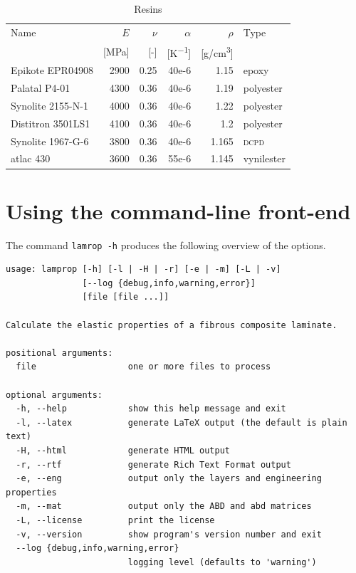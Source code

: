 \documentclass[a4paper,landscape,oneside,11pt,twocolumn]{memoir}
\begin{document}
\begin{table}[!htbp]
  \centering
  \caption{\label{tb:resins}Resins}
  \begin{tabular}{lrrrrl}%
      Name & $E$ & $\nu$ & $\alpha$ & $\rho$ & Type\\
      & [\si{MPa}] & [-] & [\si{K^{-1}}] & [\si{g/cm^3}]\\
    \midrule
      Epikote EPR04908 & 2900 & 0.25 & 40e-6 & 1.15 & epoxy\\
      Palatal P4-01 & 4300 & 0.36 & 40e-6 & 1.19 & polyester\\
      Synolite 2155-N-1 & 4000 & 0.36 & 40e-6 & 1.22 & polyester\\
      Distitron 3501LS1 & 4100 & 0.36 & 40e-6 & 1.2 & polyester\\
      Synolite 1967-G-6 & 3800 & 0.36 & 40e-6 & 1.165 & \textsc{dcpd}\\
      atlac 430 & 3600 & 0.36 & 55e-6 & 1.145 & vynilester\\
  \end{tabular}
\end{table}

\section{Using the command-line front-end} %

The command \texttt{lamrop -h} produces the following overview of the options.

\begin{lstlisting}[style=plain]
usage: lamprop [-h] [-l | -H | -r] [-e | -m] [-L | -v]
               [--log {debug,info,warning,error}]
               [file [file ...]]

Calculate the elastic properties of a fibrous composite laminate.

positional arguments:
  file                  one or more files to process

optional arguments:
  -h, --help            show this help message and exit
  -l, --latex           generate LaTeX output (the default is plain text)
  -H, --html            generate HTML output
  -r, --rtf             generate Rich Text Format output
  -e, --eng             output only the layers and engineering properties
  -m, --mat             output only the ABD and abd matrices
  -L, --license         print the license
  -v, --version         show program's version number and exit
  --log {debug,info,warning,error}
                        logging level (defaults to 'warning')
\end{lstlisting}
\end{document}

